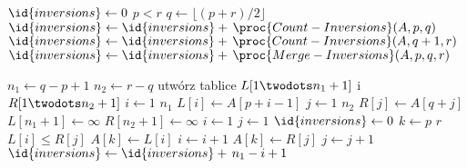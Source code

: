 \begin{codebox}
\li	$\id{inversions}\gets0$
\li	\If $p<r$
\li		\Then
			$q\gets\lfloor(p+r)/2\rfloor$
\li			$\id{inversions}\gets\id{inversions}+\,\proc{Count-Inversions}(A,p,q)$
\li			$\id{inversions}\gets\id{inversions}+\,\proc{Count-Inversions}(A,q+1,r)$
\li			$\id{inversions}\gets\id{inversions}+\,\proc{Merge-Inversions}(A,p,q,r)$
		\End
\li	\Return{}
\end{codebox}

\begin{codebox}
\li	$n_1\gets q-p+1$
\li	$n_2\gets r-q$
\li	utwórz tablice $L[1\twodots n_1+1]$ i~$R[1\twodots n_2+1]$
\li	\For $i\gets1$ \To $n_1$
\li		\Do
			$L[i]\gets A[p+i-1]$
		\End
\li	\For $j\gets1$ \To $n_2$
\li		\Do
			$R[j]\gets A[q+j]$
		\End
\li	$L[n_1+1]\gets\infty$
\li	$R[n_2+1]\gets\infty$
\li	$i\gets1$
\li	$j\gets1$
\li	$\id{inversions}\gets0$
\li	\For $k\gets p$ \To $r$
\li		\Do
\li			\If $L[i]\le R[j]$
\li				\Then
					$A[k]\gets L[i]$
\li					$i\gets i+1$
\li				\Else
					$A[k]\gets R[j]$
\li					$j\gets j+1$
\li					$\id{inversions}\gets\id{inversions}+\,n_1-i+1$
				\End
		\End
\li	\Return{}
\end{codebox}

\endinput

